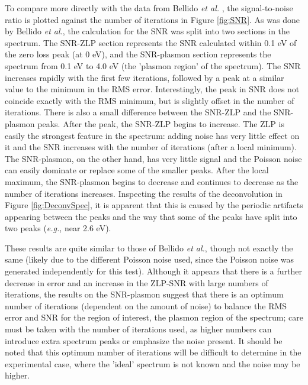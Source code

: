 \documentclass[12pt, titlepage]{article}
\begin{document}
To compare more directly with the data from Bellido \textit{et al.}
\cite{bellido_toward_2014}, the signal-to-noise ratio is plotted against the
number of iterations in Figure \ref{fig:SNR}. As was done by Bellido \textit{et
    al.}, the calculation for the SNR was split into two sections in the spectrum.
The SNR-ZLP section represents the SNR calculated within 0.1 eV of the zero loss
peak (at 0 eV), and the SNR-plasmon section represents the spectrum from 0.1 eV
to 4.0 eV (the 'plasmon region' of the spectrum). The SNR increases rapidly with
the first few iterations, followed by a peak at a similar value to the minimum
in the RMS error. Interestingly, the peak in SNR does not coincide exactly with
the RMS minimum, but is slightly offset in the number of iterations. There is
also a small difference between the SNR-ZLP and the SNR-plasmon peaks. After the
peak, the SNR-ZLP begins to increase. The ZLP is easily the strongest feature in
the spectrum: adding noise has very little effect on it and the SNR increases
with the number of iterations (after a local minimum). The SNR-plasmon, on the
other hand, has very little signal and the Poisson noise can easily dominate or
replace some of the smaller peaks. After the local maximum, the SNR-plasmon
begins to decrease and continues to decrease as the number of iterations
increases. Inspecting the results of the deconvolution in Figure
\ref{fig:DeconvSpec}, it is apparent that this is caused by the periodic
artifacts appearing between the peaks and the way that some of the peaks have
split into two peaks (\textit{e.g.}, near 2.6 eV).

These results are quite similar to those of Bellido \textit{et al.}, though not
exactly the same (likely due to the different Poisson noise used, since the
Poisson noise was generated independently for this test). Although it appears
that there is a further decrease in error and an increase in the ZLP-SNR with
large numbers of iterations, the results on the SNR-plasmon suggest that there
is an optimum number of iterations (dependent on the amount of noise) to balance
the RMS error and SNR for the region of interest, the plasmon region of the
spectrum; care must be taken with the number of iterations used, as higher
numbers can introduce extra spectrum peaks or emphasize the noise present. It
should be noted that this optimum number of iterations will be difficult to
determine in the experimental case, where the 'ideal' spectrum is not known and
the noise may be higher.
\end{document}
